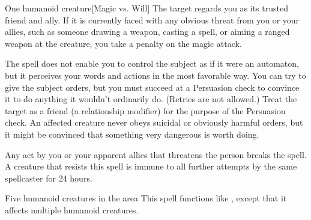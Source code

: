 \spellrng{\rngmed}
\spelldur{\durlong}
\begin{spelltarget}{One humanoid creature}[Magic vs. Will]
    \spellsuccess The target regards you as its trusted friend and ally. If it is currently faced with any obvious threat from you or your allies, such as someone drawing a weapon, casting a spell, or aiming a ranged weapon at the creature, you take a  penalty on the magic attack.
    \par The spell does not enable you to control the subject as if it were an automaton, but it perceives your words and actions in the most favorable way. You can try to give the subject orders, but you must succeed at a Persuasion check to convince it to do anything it wouldn't ordinarily do. (Retries are not allowed.) Treat the target as a friend (a  relationship modifier) for the purpose of the Persuasion check. An affected creature never obeys suicidal or obviously harmful orders, but it might be convinced that something very dangerous is worth doing.
\end{spelltarget}
\spellnotes Any act by you or your apparent allies that threatens the  person breaks the spell. A creature that resists this spell is immune to all further attempts by the same spellcaster for 24 hours.

\begin{spelltargets}{Five humanoid creatures in the area}
    \spellsuccess This spell functions like , except that it affects multiple humanoid creatures.
\end{spelltargets}


